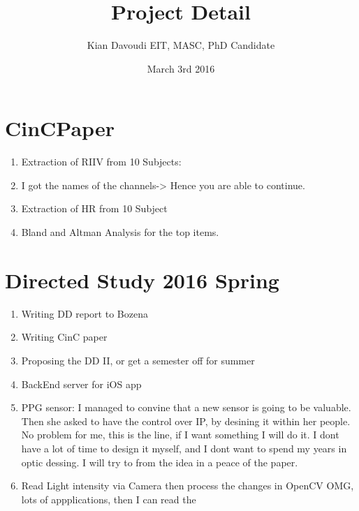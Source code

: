 \documentclass{IEEEtran}
\title{Project Detail}
\author{Kian Davoudi EIT, MASC, PhD Candidate}
\date{March 3rd 2016}
\begin{document}
\maketitle

\section{CinCPaper}
\begin{enumerate}
\item Extraction of RIIV from 10 Subjects: 
\item I got the names of the channels-> Hence you are able to continue. 
\item Extraction of HR from 10 Subject
\item Bland and Altman Analysis for the top items. 
\end{enumerate}

\section{Directed Study 2016 Spring}
\begin{enumerate}
\item Writing DD report to Bozena
\item Writing CinC paper 
\item Proposing the DD II, or get a semester off for summer
\item BackEnd server for iOS app
\item PPG sensor: I managed to convine that a new sensor is going to be valuable. Then she asked to have the control over IP, by desining it within her people. No problem for me, this is the line, if I want something I will do it. I dont have a lot of time to design it myself, and I dont want to spend my years in optic dessing. I will try to from the idea in a peace of the paper. 
\item Read Light intensity via Camera then process the changes in OpenCV OMG, lots of appplications, then I can read the 
\end{enumerate}
\end{document}
